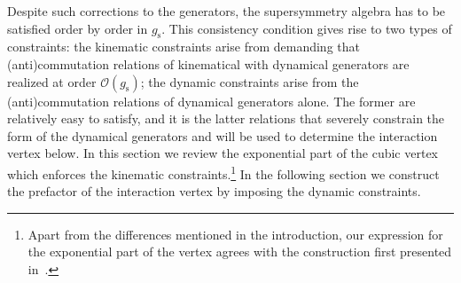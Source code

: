 \documentclass[12pt]{article}
\def\mc{\mathcal}
\numberwithin{equation}{section} \setlength{\textwidth}{17cm}
\begin{document}
\noindent Despite such corrections to the generators, the supersymmetry 
algebra has to be satisfied order by order in $g_{\text{s}}$. This consistency condition gives rise to two
types of constraints: the kinematic constraints arise
from demanding that (anti)commutation relations of kinematical with dynamical
generators are realized at order ${\mc O}(g_{\text{s}})$; the dynamic constraints arise from the 
(anti)commutation relations of dynamical generators alone. The former are relatively easy to satisfy, and
it is the latter relations that severely constrain the
form of the dynamical generators and will be used to determine the interaction vertex below.
In this section we review the exponential part of the cubic vertex which enforces
the kinematic constraints.\footnote{Apart from the differences mentioned in the introduction,
our expression for the exponential part of the vertex agrees with the construction first presented in~\cite{sv}.}
In the following section we construct the prefactor of the interaction vertex
by imposing the dynamic constraints.
\end{document}
